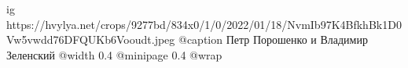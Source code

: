  
 
 
 
 

\ifcmt
  ig https://hvylya.net/crops/9277bd/834x0/1/0/2022/01/18/NvmIb97K4BfkhBk1D0Vw5vwdd76DFQUKb6Vooudt.jpeg
  @caption Петр Порошенко и Владимир Зеленский
  @width 0.4
  @minipage 0.4
  @wrap \parpic[r]
\fi
